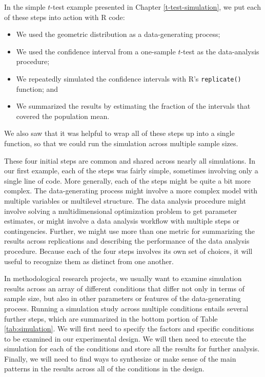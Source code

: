 \documentclass[
]{book}
\providecommand{\tightlist}{%
  \setlength{\itemsep}{0pt}\setlength{\parskip}{0pt}}
\begin{document}
In the simple \(t\)-test example presented in Chapter \ref{t-test-simulation}, we put each of these steps into action with R code:

\begin{itemize}
\tightlist
\item
  We used the geometric distribution as a data-generating process;
\item
  We used the confidence interval from a one-sample \(t\)-test as the data-analysis procedure;
\item
  We repeatedly simulated the confidence intervals with R's \texttt{replicate()} function; and
\item
  We summarized the results by estimating the fraction of the intervals that covered the population mean.
\end{itemize}

We also saw that it was helpful to wrap all of these steps up into a single function, so that we could run the simulation across multiple sample sizes.

These four initial steps are common and shared across nearly all simulations.
In our first example, each of the steps was fairly simple, sometimes involving only a single line of code.
More generally, each of the steps might be quite a bit more complex. The data-generating process might involve a more complex model with multiple variables or multilevel structure.
The data analysis procedure might involve solving a multidimensional optimization problem to get parameter estimates, or might involve a data analysis workflow with multiple steps or contingencies.
Further, we might use more than one metric for summarizing the results across replications and describing the performance of the data analysis procedure.
Because each of the four steps involves its own set of choices, it will useful to recognize them as distinct from one another.

In methodological research projects, we usually want to examine simulation results across an array of different conditions that differ not only in terms of sample size, but also in other parameters or features of the data-generating process.
Running a simulation study across multiple conditions entails several further steps, which are summarized in the bottom portion of Table \ref{tab:simulation}. We will first need to specify the factors and specific conditions to be examined in our experimental design. We will then need to execute the simulation for each of the conditions and store all the results for further analysis. Finally, we will need to find ways to synthesize or make sense of the main patterns in the results across all of the conditions in the design.
\end{document}
